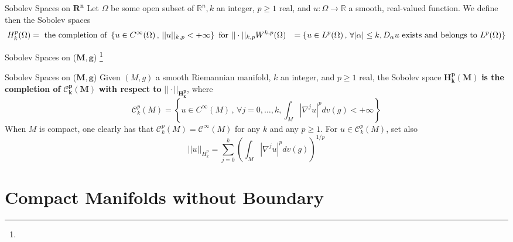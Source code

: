 \documentclass[xcolor=table,dvipsnames,svgnames,aspectratio=169,fontset=windows]{ctexbeamer}
\let\\\relax
\begin{document}
\begin{frame}{Sobolev Spaces on $\mathbf{R^n}$ }
  Let $\Omega$ be some open subset of $\mathbb{R}^n, k$ an integer, $p \geq 1$ real, and $u: \Omega \rightarrow \mathbb{R}$ a smooth, real-valued function. We define then the Sobolev spaces
  $$
  \begin{aligned}
  H_k^p(\Omega)&=\text { the completion of }\left\{u \in C^{\infty}(\Omega) \,,\,||u||_{k, p}<+\infty\right\} \text { for }||\cdot||_{k, p} \\
  W^{k,p}(\Omega)&=\left\{u \in L^p(\Omega) \,,\, \forall|\alpha| \leq k, D_\alpha u \text { exists and belongs to } L^p(\Omega)\right\}\\
  \end{aligned}
  $$

  \vskip 5pt
  
\end{frame}

\begin{frame}{Sobolev Spaces on ($\mathbf{M,g}$) \footnote{} }
  \begin{alertblock}{Sobolev Spaces on ($\mathbf{M,g}$) }
    Given $(M, g)$ a smooth Riemannian manifold, $k$ an integer, and $p \geq 1$ real, the Sobolev space $\bm{H_k^p(M)}$ \textbf{is the completion of} $\bm{\mathcal{C}_k^p(M)}$ \textbf{with respect to} $\bm{||\cdot||_{H_k^p}}$, where
    \vskip -1pt
    $$
    \mathcal{C}_k^p(M)=\left\{u \in C^{\infty}(M) \,,\, \forall j=0, \ldots, k, \int_M\left|\nabla^j u\right|^p d v(g)<+\infty\right\}
    $$
    When $M$ is compact, one clearly has that $\mathcal{C}_k^p(M)=\mathcal{C}^{\infty}(M)$ for any $k$ and any $p \geq 1$. For $u \in \mathcal{C}_k^p(M)$, set also
    \vskip -1pt
    $$
    ||u||_{H_k^p}=\sum_{j=0}^k\left(\int_M\left|\nabla^j u\right|^p d v(g)\right)^{1 / p}
    $$
  \end{alertblock}
\end{frame}


\section{Compact Manifolds without Boundary}
\end{document}
